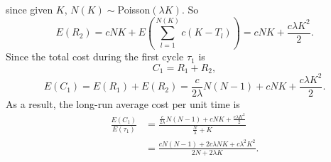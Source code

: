 \documentclass{extarticle}
\theoremstyle{plain}
\theoremstyle{definition}
\begin{document}
since given $K$, $N(K)\sim$Poisson$(\lambda K)$.
So
\[E(R_2) = cNK + E\left( \sum_{l=1}^{N(K)}c(K-T_l) \right) = cNK + \frac{c\lambda K^2}{2}.\]
Since the total cost during the first cycle $\tau_1$ is 
\[C_1 = R_1 + R_2,\]
\[E(C_1) = E(R_1) + E(R_2) = \frac{c}{2\lambda}N(N-1) + cNK + \frac{c\lambda K^2}{2}.\]
As a result, the long-run average cost per unit time is 
\begin{align*}
	\frac{E(C_1)}{E(\tau_1)} &= \frac{\frac{c}{2\lambda}N(N-1) + cNK + \frac{c\lambda K^2}{2}}{\frac{N}{\lambda}  + K}\\
  							 &= \frac{cN(N-1) + 2c\lambda NK + c\lambda^2 K^2}{2N + 2\lambda K}.
\end{align*}
\end{document}

